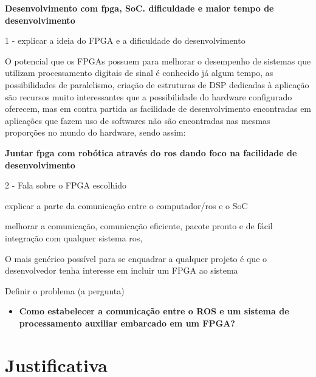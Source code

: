 \textbf{Desenvolvimento com fpga, SoC. dificuldade e maior tempo de desenvolvimento}

1 - explicar a ideia do FPGA e a dificuldade do desenvolvimento

 O potencial que os FPGAs possuem para melhorar o 
desempenho de sistemas que utilizam processamento digitais de sinal é conhecido já algum
tempo, as possibilidades de paralelismo, criação de estruturas de DSP dedicadas à aplicação
são recursos muito interessantes que a possibilidade do hardware configurado oferecem,
mas em contra partida as facilidade de desenvolvimento encontradas em aplicações que
fazem uso de softwares não são encontradas nas mesmas proporções no mundo do hardware,
sendo assim:

\textbf{Juntar fpga com robótica através do ros dando foco na facilidade de desenvolvimento}

2 - Fala sobre o FPGA escolhido

explicar a parte da comunicação entre o computador/ros e o SoC

melhorar a comunicação, comunicação eficiente, pacote pronto e de fácil integração com qualquer sistema 
ros,

O mais genérico possível para se enquadrar a qualquer projeto é que o desenvolvedor tenha
interesse em incluir um FPGA ao sistema


Definir o problema (a pergunta)

\begin{itemize}
    \item \textbf{Como estabelecer a comunicação entre o ROS e um sistema de processamento auxiliar 
embarcado em um FPGA?}

\end{itemize}














\section{Justificativa}

